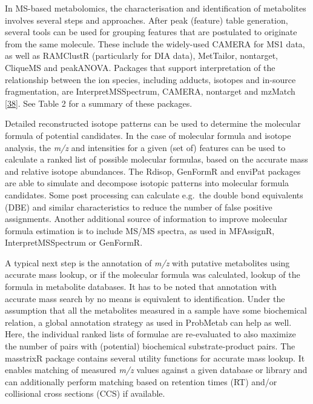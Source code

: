 \documentclass[]{article}
\begin{document}
In MS-based metabolomics, the characterisation and identification of metabolites involves several steps and approaches. After peak (feature) table generation, several tools can be used for grouping features that are postulated to originate from the same molecule. These include the widely-used CAMERA for MS1 data, as well as RAMClustR (particularly for DIA data), MetTailor, nontarget, CliqueMS and peakANOVA. Packages that support interpretation of the relationship between the ion species, including adducts, isotopes and in-source fragmentation, are InterpretMSSpectrum, CAMERA, nontarget and mzMatch {[}\protect\hyperlink{ref-scheltema_2011}{38}{]}. See Table 2 for a summary of these packages.

Detailed reconstructed isotope patterns can be used to determine the molecular formula of potential candidates. In the case of molecular formula and isotope analysis, the \emph{m/z} and intensities for a given (set of) features can be used to calculate a ranked list of possible molecular formulas, based on the accurate mass and relative isotope abundances. The Rdisop, GenFormR and enviPat packages are able to simulate and decompose isotopic patterns into molecular formula candidates. Some post processing can calculate e.g.~the double bond equivalents (DBE) and similar characteristics to reduce the number of false positive assignments. Another additional source of information to improve molecular formula estimation is to include MS/MS spectra, as used in MFAssignR, InterpretMSSpectrum or GenFormR.

A typical next step is the annotation of \emph{m/z} with putative metabolites using accurate mass lookup, or if the molecular formula was calculated, lookup of the formula in metabolite databases. It has to be noted that annotation with accurate mass search by no means is equivalent to identification. Under the assumption that all the metabolites measured in a sample have some biochemical relation, a global annotation strategy as used in ProbMetab can help as well. Here, the individual ranked lists of formulae are re-evaluated to also maximize the number of pairs with (potential) biochemical substrate-product pairs. The masstrixR package contains several utility functions for accurate mass lookup. It enables matching of measured \emph{m/z} values against a given database or library and can additionally perform matching based on retention times (RT) and/or collisional cross sections (CCS) if available.
\end{document}
